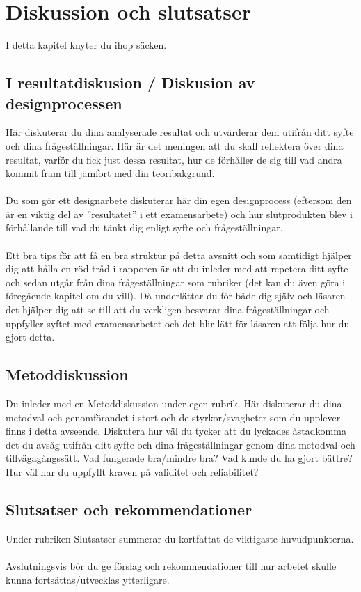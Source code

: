 \section{Diskussion och slutsatser}
I detta kapitel knyter du ihop säcken.


\subsection{I resultatdiskusion / Diskusion av designprocessen}
Här diskuterar du dina analyserade resultat och utvärderar dem utifrån ditt syfte och dina frågeställningar. Här är det meningen att du skall reflektera över dina resultat, varför du fick just dessa resultat, hur de förhåller de sig till vad andra kommit fram till jämfört med din teoribakgrund.\\ \\
Du som gör ett designarbete diskuterar här din egen designprocess (eftersom den är en viktig del av ”resultatet” i ett examensarbete) och hur slutprodukten blev i förhållande till vad du tänkt dig enligt syfte och frågeställningar.\\ \\
Ett bra tips för att få en bra struktur på detta avsnitt och som samtidigt hjälper dig att hålla en röd tråd i rapporen är att du inleder med att repetera ditt syfte och sedan utgår från dina frågeställningar som rubriker (det kan du även göra i föregående kapitel om du vill). Då underlättar du för både dig själv och läsaren – det hjälper dig att se till att du verkligen besvarar dina frågeställningar och uppfyller syftet med examensarbetet och det blir lätt för läsaren att följa hur du gjort detta.

\subsection{Metoddiskussion}
Du inleder med en Metoddiskussion under egen rubrik. Här diskuterar du dina metodval och genomförandet i stort och de styrkor/svagheter som du upplever finns i detta avseende. Diskutera hur väl du tycker att du lyckades åstadkomma det du avsåg utifrån ditt syfte och dina frågeställningar genom dina metodval och tillvägagångssätt. Vad fungerade bra/mindre bra? Vad kunde du ha gjort bättre? Hur väl har du uppfyllt kraven på validitet och reliabilitet?

\subsection{Slutsatser och rekommendationer}
Under rubriken Slutsatser summerar du kortfattat de viktigaste huvudpunkterna.\\ \\
Avslutningsvis bör du ge förslag och rekommendationer till hur arbetet skulle kunna fortsättas/utvecklas ytterligare.